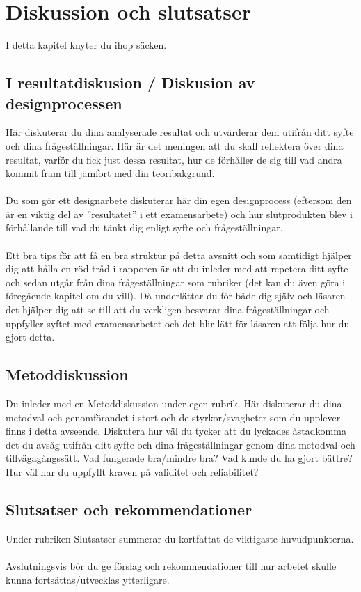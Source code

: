 \section{Diskussion och slutsatser}
I detta kapitel knyter du ihop säcken.


\subsection{I resultatdiskusion / Diskusion av designprocessen}
Här diskuterar du dina analyserade resultat och utvärderar dem utifrån ditt syfte och dina frågeställningar. Här är det meningen att du skall reflektera över dina resultat, varför du fick just dessa resultat, hur de förhåller de sig till vad andra kommit fram till jämfört med din teoribakgrund.\\ \\
Du som gör ett designarbete diskuterar här din egen designprocess (eftersom den är en viktig del av ”resultatet” i ett examensarbete) och hur slutprodukten blev i förhållande till vad du tänkt dig enligt syfte och frågeställningar.\\ \\
Ett bra tips för att få en bra struktur på detta avsnitt och som samtidigt hjälper dig att hålla en röd tråd i rapporen är att du inleder med att repetera ditt syfte och sedan utgår från dina frågeställningar som rubriker (det kan du även göra i föregående kapitel om du vill). Då underlättar du för både dig själv och läsaren – det hjälper dig att se till att du verkligen besvarar dina frågeställningar och uppfyller syftet med examensarbetet och det blir lätt för läsaren att följa hur du gjort detta.

\subsection{Metoddiskussion}
Du inleder med en Metoddiskussion under egen rubrik. Här diskuterar du dina metodval och genomförandet i stort och de styrkor/svagheter som du upplever finns i detta avseende. Diskutera hur väl du tycker att du lyckades åstadkomma det du avsåg utifrån ditt syfte och dina frågeställningar genom dina metodval och tillvägagångssätt. Vad fungerade bra/mindre bra? Vad kunde du ha gjort bättre? Hur väl har du uppfyllt kraven på validitet och reliabilitet?

\subsection{Slutsatser och rekommendationer}
Under rubriken Slutsatser summerar du kortfattat de viktigaste huvudpunkterna.\\ \\
Avslutningsvis bör du ge förslag och rekommendationer till hur arbetet skulle kunna fortsättas/utvecklas ytterligare.